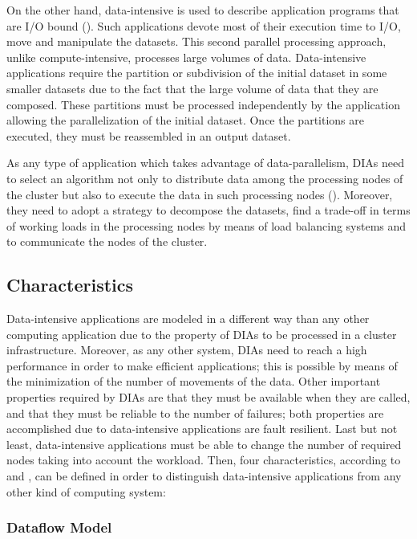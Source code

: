 On the other hand, data-intensive is used to describe application programs that are I/O bound (\cite{dataintensivecomputingIEEE}). Such applications devote most of their execution time to I/O, move and manipulate the datasets. This second parallel processing approach, unlike compute-intensive, processes large volumes of data. Data-intensive applications require the partition or subdivision of the initial dataset in some smaller datasets due to the fact that the large volume of data that they are composed. These partitions must be processed independently by the application allowing the parallelization of the initial dataset. Once the partitions are executed, they must be reassembled in an output dataset.

As any type of application which takes advantage of data-parallelism, DIAs need to select an algorithm not only to distribute data among the processing nodes of the cluster but also to execute the data in such processing nodes (\cite{terascalechallenge}). Moreover, they need to adopt a strategy to decompose the datasets, find a trade-off in terms of working loads in the processing nodes by means of load balancing systems and to communicate the nodes of the cluster.

\subsection{Characteristics}

Data-intensive applications are modeled in a different way than any other computing application due to the property of DIAs to be processed in a cluster infrastructure. Moreover, as any other system, DIAs need to reach a high performance in order to make efficient applications; this is possible by means of the minimization of the number of movements of the data. Other important properties required by DIAs are that they must be available when they are called, and that they must be reliable to the number of failures; both properties are accomplished due to data-intensive applications are fault resilient. Last but not least, data-intensive applications must be able to change the number of required nodes taking into account the workload. Then, four characteristics, according to \cite{distributedcomputing} and \cite{scalablecomputing}, can be defined in order to distinguish data-intensive applications from any other kind of computing system:

\subsubsection*{Dataflow Model}

